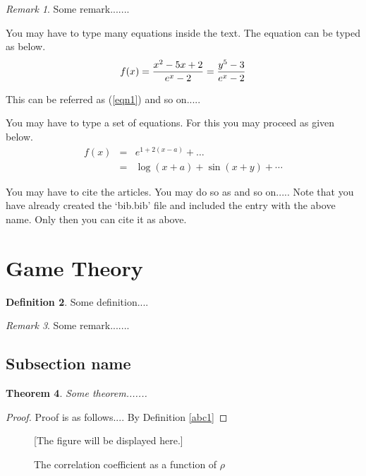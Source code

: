 \documentclass[12pt,a4paper]{report}
\theoremstyle{plain}
\newtheorem{theorem}{Theorem}[section]
\theoremstyle{definition}
\newtheorem{definition}[theorem]{Definition}
\theoremstyle{remark}
\newtheorem{remark}[theorem]{Remark}
\begin{document}
\begin{remark}
Some remark.......
\end{remark}


You may have to type many equations inside the text.  The equation can be typed as below.
\begin{equation}\label{eqn1}
f(x) = \frac{x^2-5x+2}{e^x - 2} = {y^5-3 \over e^x-2} %
\end{equation}

This can be referred as (\ref{eqn1}) and so on.....

You may have to type a set of equations.  For this you may proceed as given below.
\begin{eqnarray}
f(x) &=& e^{1+2(x-a)} + \ldots   \nonumber   \\
  &=& \log(x+a) + \sin(x+y) + \cdots  \label{eqn2}
\end{eqnarray}


You may have to cite the articles.  You may do so as \cite{laan} and so on.....
Note that you have already created the `bib.bib' file and included the entry with the above name. Only
then you can cite it as above.

\section{Game Theory}
\begin{definition}\label{abc2}
Some definition....
\end{definition}

\begin{remark}
Some remark.......
\end{remark}

\subsection{Subsection name}

\begin{theorem}
Some theorem.......
\end{theorem}

\begin{proof}
Proof is as follows.... By Definition \ref{abc1}
\end{proof}


\begin{figure}[h]

[The figure will be displayed here.]

\caption{The correlation coefficient as a function of $\rho$}
\end{figure}
\end{document}
